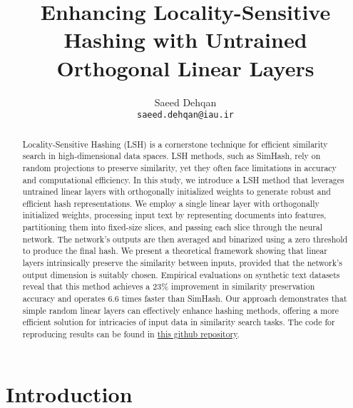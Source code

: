 \documentclass{article}
\title{Enhancing Locality-Sensitive Hashing with Untrained Orthogonal Linear Layers}
\author{
 Saeed Dehqan \\
  \texttt{saeed.dehqan@iau.ir} \\
}
\begin{document}
\maketitle
\begin{abstract}
Locality-Sensitive Hashing (LSH) is a cornerstone technique for efficient similarity search in high-dimensional data spaces. LSH methods, such as SimHash, rely on random projections to preserve similarity, yet they often face limitations in accuracy and computational efficiency. In this study, we introduce a LSH method that leverages untrained linear layers with orthogonally initialized weights to generate robust and efficient hash representations. We employ a single linear layer with orthogonally initialized weights, processing input text by representing documents into features, partitioning them into fixed-size slices, and passing each slice through the neural network. The network's outputs are then averaged and binarized using a zero threshold to produce the final hash. We present a theoretical framework showing that linear layers intrinsically preserve the similarity between inputs, provided that the network's output dimension is suitably chosen. Empirical evaluations on synthetic text datasets reveal that this method achieves a 23\% improvement in similarity preservation accuracy and operates 6.6 times faster than SimHash. Our approach demonstrates that simple random linear layers can effectively enhance hashing methods, offering a more efficient solution for intricacies of input data in similarity search tasks. The code for reproducing results can be found in \href{https://github.com/saeeddhqan/entropy_hash}{this github repository}.
\end{abstract}




\section{Introduction}
\end{document}
